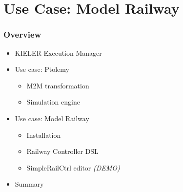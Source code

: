 \documentclass{beamer}
\newcommand{\GRAY}[1]{\textcolor[rgb]{0.60,0.60,0.60}{#1}}
\begin{document}
\section*{Use Case: Model Railway}
\begin{frame}
  \frametitle{Overview}
    \begin{itemize}
	      \item \GRAY{KIELER Execution Manager}
	      \item \GRAY{Use case: Ptolemy }
        \begin{itemize}
       	       \item \GRAY{M2M transformation}
       	       \item \GRAY{Simulation engine}
        \end{itemize}
	      \item Use case: Model Railway
        \begin{itemize}
	            \item Installation
	            \item Railway Controller DSL
	            \item SimpleRailCtrl editor \emph{(DEMO)}
        \end{itemize}
	      \item \GRAY{Summary}
    \end{itemize}
\end{frame}
\end{document}
